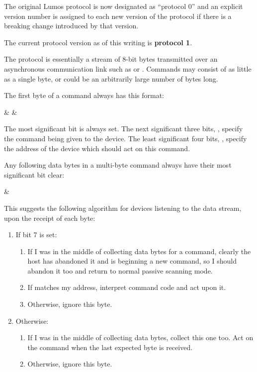 \documentclass[letterpaper,twoside,onecolumn,openright,final]{memoir}
\begin{document}
The original Lumos protocol is now designated as ``protocol 0'' and an explicit version number is assigned
to each new version of the protocol if there is a breaking change introduced by that version.

The current protocol version as of this writing is {\bfseries protocol 1}.

The protocol is essentially a stream of 8-bit bytes transmitted over an asynchronous communication link
such as  or .  Commands may consist of as little as a single byte, or could be an arbitrarily
large number of bytes long.  

The first byte of a command always has this format:  
\begin{BF}
	 &  & 
\end{BF}
The most significant bit is always set.  The next significant three bits, , specify the
command being given to the device.  The least significant four bits, , specify the
address of the device which should act on this command.

Any following data bytes in a multi-byte command always have their most significant bit clear:
\begin{BF}
	 & 
\end{BF}

This suggests the following algorithm for devices listening to the data stream, upon the receipt
of each byte:

\begin{enumerate}
	\item	If bit 7 is set:
		\begin{enumerate}
			\item	If I was in the middle of collecting data bytes for a command,
				clearly the host has abandoned it and is beginning a new command, 
				so I should abandon it too and return to normal passive scanning mode.
			\item	If  matches my address, interpret command code 
				and act upon it.
			\item	Otherwise, ignore this byte.
		\end{enumerate}
	\item	Otherwise:
		\begin{enumerate}
			\item	If I was in the middle of collecting data bytes, collect this one too.
				Act on the command when the last expected byte is received.
			\item	Otherwise, ignore this byte.
		\end{enumerate}
\end{enumerate}
\end{document}
